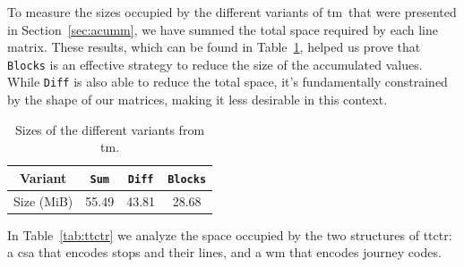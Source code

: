     To measure the sizes occupied by the different variants of \gls{tm}~that were presented in Section~\ref{sec:acumm}, we have summed the total space required by each line matrix. These results, which can be found in Table~\ref{tab:acuum}, helped us prove that \texttt{Blocks} is an effective strategy to reduce the size of the accumulated values. While \texttt{Diff} is also able to reduce the total space, it's fundamentally constrained by the shape of our matrices, making it less desirable in this context.
    
    \begin{table}
        \centering
        \caption{Sizes of the different variants from \acrshort{tm}.}
        \label{tab:acuum}
        \begin{tabular}{|c|c|c|c|}
        \hline
            Variant & \texttt{Sum} & \texttt{Diff} & \texttt{Blocks} \\
            \hline
            Size (MiB) & 55.49 & 43.81 & 28.68 \\
        \hline
        \end{tabular}
    \end{table}
    
    In Table~\ref{tab:ttctr} we analyze the space occupied by the two structures of \gls{ttctr}: a \gls{csa} that encodes stops and their lines, and a \gls{wm} that encodes journey codes.
    
